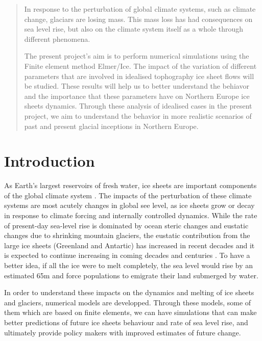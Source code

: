 \documentclass[a4paper,12pt]{article}
\begin{document}
\tableofcontents

\newpage
\begin{abstract}
	\justifying
	In response to the perturbation of global climate systems, such as climate change, glaciars are losing mass. This mass loss has had consequences on sea level rise, but also on the climate system itself as a whole through different phenomena. 
	
	The present project's aim is to perform numerical simulations using the Finite element method Elmer/Ice. The impact of the variation of different parameters that are involved in idealised tophography ice sheet flows will be studied. These results will help us to better understand the behiavor and the importance that these parameters have on Northern Europe ice sheets dynamics. Through these analysis of idealised cases in the present project, we aim to understand the behavior in more realistic scenarios of past and present glacial inceptions in Northern Europe. 
\end{abstract}
\pagebreak

\section{Introduction}
\justifying
As Earth's largest reservoirs of fresh water, ice sheets are important components of the global climate system \cite[]{zhang2017comparison}. The impacts of the perturbation of these climate systems are most acutely changes in global see level, as ice sheets grow or decay in response to climate forcing and internally controlled dynamics. While the rate of present-day sea-level rise is dominated by ocean steric changes and eustatic changes due to shrinking mountain glaciers, the eustatic contribution from the large ice sheets (Greenland and Antartic) has increased in recent decades and it is expected to continue increasing in coming decades and centuries \cite[]{clark2015recent}. To have a better idea, if all the ice were to melt completely, the sea level would rise by an estimated 65m \cite[]{morlighem2017bedmachine,haywood2011pliocene} and force populations to emigrate their land submerged by water.

In order to understand these impacts on the dynamics and melting of ice sheets and glaciers, numerical models are developped. Through these models, some of them which are based on finite elements, we can have simulations that can make better predictions of future ice sheets behaviour and rate of sea level rise, and ultimately provide policy makers with improved estimates of future change.
\end{document}
